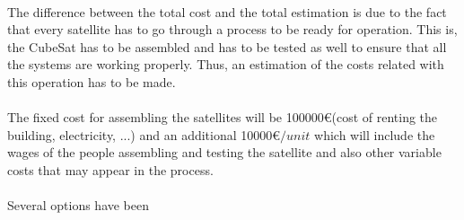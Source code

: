 \paragraph{}The difference between the total cost and the total estimation is due to the fact that every satellite has to go through a process to be ready for operation. This is, the CubeSat has to be assembled and has to be tested as well to ensure that all the systems are working properly. Thus, an estimation of the costs related with this operation has to be made.

\paragraph{}The fixed cost for assembling the satellites will be 100000\euro (cost of renting the building, electricity, ...) and an additional 10000\euro $ / unit$ which will include the wages of the people assembling and testing the satellite and also other variable costs that may appear in the process.

\paragraph{}Several options have been